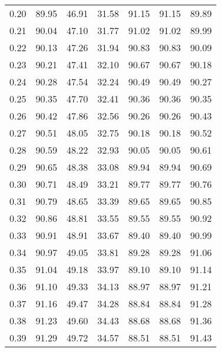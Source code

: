 \begin{tabular}{|c|c|c|c|c|c|c|}
      0.20 &     89.95 &     46.91 &      31.58 &   91.15 &      91.15 &         89.89 \\
      0.21 &     90.04 &     47.10 &      31.77 &   91.02 &      91.02 &         89.99 \\
      0.22 &     90.13 &     47.26 &      31.94 &   90.83 &      90.83 &         90.09 \\
      0.23 &     90.21 &     47.41 &      32.10 &   90.67 &      90.67 &         90.18 \\
      0.24 &     90.28 &     47.54 &      32.24 &   90.49 &      90.49 &         90.27 \\
      0.25 &     90.35 &     47.70 &      32.41 &   90.36 &      90.36 &         90.35 \\
      0.26 &     90.42 &     47.86 &      32.56 &   90.26 &      90.26 &         90.43 \\
      0.27 &     90.51 &     48.05 &      32.75 &   90.18 &      90.18 &         90.52 \\
      0.28 &     90.59 &     48.22 &      32.93 &   90.05 &      90.05 &         90.61 \\
      0.29 &     90.65 &     48.38 &      33.08 &   89.94 &      89.94 &         90.69 \\
      0.30 &     90.71 &     48.49 &      33.21 &   89.77 &      89.77 &         90.76 \\
      0.31 &     90.79 &     48.65 &      33.39 &   89.65 &      89.65 &         90.85 \\
      0.32 &     90.86 &     48.81 &      33.55 &   89.55 &      89.55 &         90.92 \\
      0.33 &     90.91 &     48.91 &      33.67 &   89.40 &      89.40 &         90.99 \\
      0.34 &     90.97 &     49.05 &      33.81 &   89.28 &      89.28 &         91.06 \\
      0.35 &     91.04 &     49.18 &      33.97 &   89.10 &      89.10 &         91.14 \\
      0.36 &     91.10 &     49.33 &      34.13 &   88.97 &      88.97 &         91.21 \\
      0.37 &     91.16 &     49.47 &      34.28 &   88.84 &      88.84 &         91.28 \\
      0.38 &     91.23 &     49.60 &      34.43 &   88.68 &      88.68 &         91.36 \\
      0.39 &     91.29 &     49.72 &      34.57 &   88.51 &      88.51 &         91.43 \\

\end{tabular}

